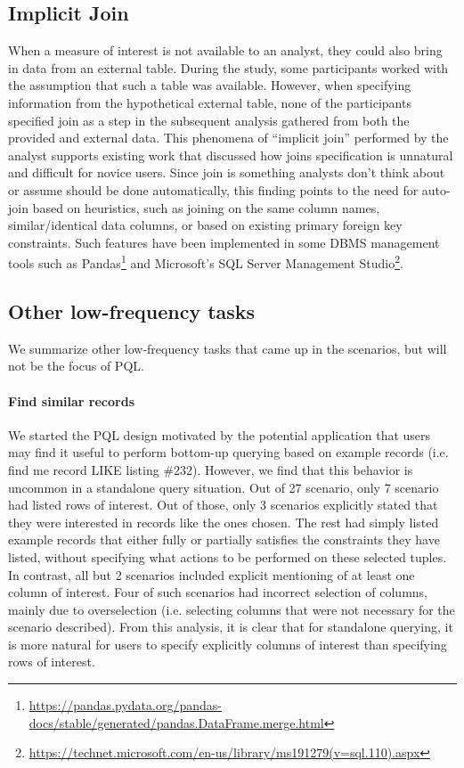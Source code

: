 \documentclass{sig-alternate-05-2015}
\begin{document}
\subsection{Implicit Join}
 \par When a measure of interest is not available to an analyst, they could also bring in data from an external table. During the study, some participants worked with the assumption that such a table was available. However, when specifying information from the hypothetical external table, none of the participants specified join as a step in the subsequent analysis gathered from both the provided and external data. This phenomena of ``implicit join'' performed by the analyst supports existing work that discussed how joins specification is unnatural and difficult for novice users\cite{Nandi2013,Khoussainova2010,Morton2014,Jagadish2007}. Since join is something analysts don't think about or assume should be done automatically, this finding points to the need for auto-join based on heuristics, such as joining on the same column names, similar/identical data columns, or based on existing primary foreign key constraints. Such features have been implemented in some DBMS management tools such as Pandas\footnote{\url{https://pandas.pydata.org/pandas-docs/stable/generated/pandas.DataFrame.merge.html}} and Microsoft's SQL Server Management Studio\footnote{\url{https://technet.microsoft.com/en-us/library/ms191279(v=sql.110).aspx}}.
\subsection{Other low-frequency tasks}
\par We summarize other low-frequency tasks that came up in the scenarios, but will not be the focus of PQL. 
\paragraph{Find similar records} We started the PQL design motivated by the potential application that users may find it useful to perform bottom-up querying based on example records (i.e. find me record LIKE listing \#232). However, we find that this behavior is uncommon in a standalone query situation. Out of 27 scenario, only 7 scenario had listed rows of interest. Out of those, only 3 scenarios explicitly stated that they were interested in records like the ones chosen. The rest had simply listed example records that either fully or partially satisfies the constraints they have listed, without specifying what actions to be performed on these selected tuples. In contrast, all but 2 scenarios included explicit mentioning of at least one column of interest. Four of such scenarios had incorrect selection of columns, mainly due to overselection (i.e. selecting columns that were not necessary for the scenario described). From this analysis, it is clear that for standalone querying, it is more natural for users to specify explicitly columns of interest than specifying rows of interest. 
\end{document}
